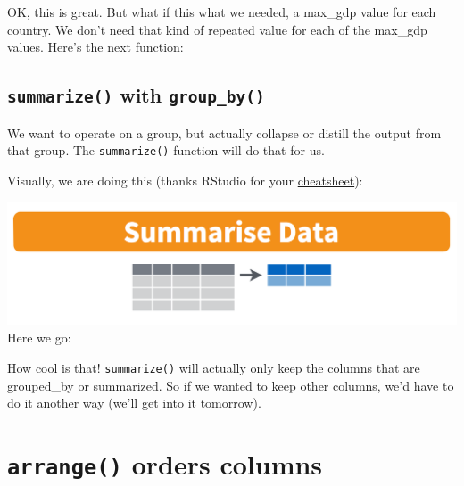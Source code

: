 \documentclass[]{book}
\newenvironment{Shaded}{\begin{snugshade}}{\end{snugshade}}
\newcommand{\KeywordTok}[1]{\textcolor[rgb]{0.13,0.29,0.53}{\textbf{#1}}}
\newcommand{\DataTypeTok}[1]{\textcolor[rgb]{0.13,0.29,0.53}{#1}}
\newcommand{\StringTok}[1]{\textcolor[rgb]{0.31,0.60,0.02}{#1}}
\newcommand{\OperatorTok}[1]{\textcolor[rgb]{0.81,0.36,0.00}{\textbf{#1}}}
\newcommand{\NormalTok}[1]{#1}
\theoremstyle{definition}
\theoremstyle{definition}
\theoremstyle{definition}
\theoremstyle{remark}
\begin{document}
OK, this is great. But what if this what we needed, a max\_gdp value for
each country. We don't need that kind of repeated value for each of the
max\_gdp values. Here's the next function:

\subsection{\texorpdfstring{\texttt{summarize()} with
\texttt{group\_by()}}{summarize() with group\_by()}}\label{summarize-with-group_by}

We want to operate on a group, but actually collapse or distill the
output from that group. The \texttt{summarize()} function will do that
for us.

Visually, we are doing this (thanks RStudio for your
\href{http://www.rstudio.com/wp-content/uploads/2015/02/data-wrangling-cheatsheet.pdf}{cheatsheet}):

\includegraphics{img/rstudio-cheatsheet-summarise.png} Here we go:

\begin{Shaded}
\end{Shaded}

How cool is that! \texttt{summarize()} will actually only keep the
columns that are grouped\_by or summarized. So if we wanted to keep
other columns, we'd have to do it another way (we'll get into it
tomorrow).

\section{\texorpdfstring{\texttt{arrange()} orders
columns}{arrange() orders columns}}\label{arrange-orders-columns}
\end{document}
